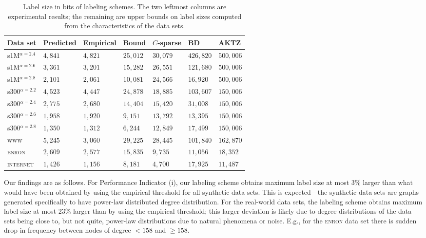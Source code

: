 \documentclass{article}
\theoremstyle{remark}
\begin{document}
\begin{table}[!ht]
\centering
\small
\begin{tabular}{l|llllll}
Data set             &Predicted & Empirical & Bound     &  $C$-sparse & BD \cite{adjiashvili2014labeling} & AKTZ \cite{alstrup2014adjacency} \\\hline
s1M$^{\alpha=2.4}$  &$4,841$    &$4,821$    & $25,012 $ &$30,079$     &$426,820$ &$500,006$\\\hline
s1M$^{\alpha=2.6}$  &$3,361$    &$3,201$    & $15,282 $ &$26,551$     &$121,680$ &$500,006$\\\hline
s1M$^{\alpha=2.8}$  &$2,101$    &$2,061$    & $10,081 $ &$24,566$     &$16,920$  &$500,006$\\\hline
s300$^{\alpha=2.2}$ &$4,523$    &$4,447$    & $24,878 $ &$18,885$     &$103,607$ &$150,006$\\\hline
s300$^{\alpha=2.4}$ &$2,775$    &$2,680$    & $14,404 $ &$15,420$     &$31,008$  &$150,006$\\\hline
s300$^{\alpha=2.6}$ &$1,958$    &$1,920$    & $9,151 $  &$13,792$     &$13,395$  &$150,006$\\\hline
s300$^{\alpha=2.8}$ &$1,350$    &$1,312$    & $6,244 $  &$12,849$     &$17,499$  &$150,006$\\\hline
\textsc{www}        &$5,245$    &$3,060$    & $29,225 $ &$28,445$     &$101,840$ &$162,870$ \\\hline
\textsc{enron}      &$2,609$    &$2,577$    & $15,835 $ &$9,735$      &$11,056$  &$18,352$\\\hline
\textsc{internet}   &$1,426$    &$1,156$    & $8,181 $  &$4,700$      &$17,925$  &$11,487$\\\hline 
\end{tabular}
\caption{Label size in bits of labeling schemes. The two leftmost columns are experimental results; the remaining are upper bounds on label sizes computed from the characteristics of the data sets.}
\label{t:labelsizes}
\end{table}

Our findings are as follows. For Performance Indicator (i), our labeling scheme obtains maximum label size at most 3\% larger than what would have been obtained by using the empirical threshold for all synthetic data sets.
This is expected---the synthetic data sets are graphs generated specifically to have power-law distributed degree distribution. For the real-world data sets, the labeling scheme
obtains maximum label size at most 23\% larger than by using the empirical threshold; this larger deviation is likely due to degree distributions of the data sets being close to, but not quite,
power-law distributions due to natural phenomena or noise. E.g., for the \textsc{enron} data set there is sudden drop in frequency between nodes of degree $< 158$ and $\geq 158$.
\end{document}
